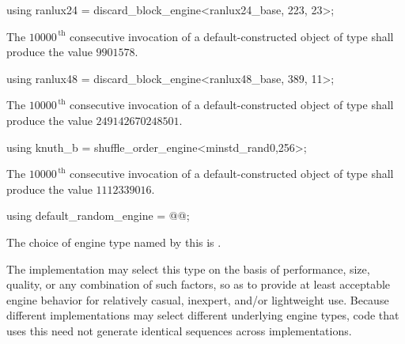 %
%
\begin{itemdecl}
using ranlux24 = discard_block_engine<ranlux24_base, 223, 23>;
\end{itemdecl}

\begin{itemdescr}
\pnum\required
 The $10000^{\,\mathrm{th}}$ consecutive invocation
 of a default-constructed object
 of type 
 shall produce the value
 $ 9901578 $.
\end{itemdescr}

%
%
\begin{itemdecl}
using ranlux48 = discard_block_engine<ranlux48_base, 389, 11>;
\end{itemdecl}

\begin{itemdescr}
\pnum\required
 The $10000^{\,\mathrm{th}}$ consecutive invocation
 of a default-constructed object
 of type 
 shall produce the value
 $ 249142670248501 $.
\end{itemdescr}

%
%
\begin{itemdecl}
using knuth_b = shuffle_order_engine<minstd_rand0,256>;
\end{itemdecl}

\begin{itemdescr}
\pnum\required
 The $10000^{\,\mathrm{th}}$ consecutive invocation
 of a default-constructed object
 of type 
 shall produce the value $1112339016$.
\end{itemdescr}%

%
%
\begin{itemdecl}
using default_random_engine = @\textit{}@;
\end{itemdecl}

\begin{itemdescr}
\pnum\remarks
The choice of engine type
named by this 
is .
\begin{note}
 The implementation
 may select this type
 on the basis of performance,
 size,
 quality,
 or any combination of such factors,
 so as to provide at least acceptable engine behavior
 for relatively casual, inexpert, and/or lightweight use.
 Because different implementations
 may select different underlying engine types,
 code that uses this 
 need not generate identical sequences across implementations.
\end{note}
\end{itemdescr}%
%
%



